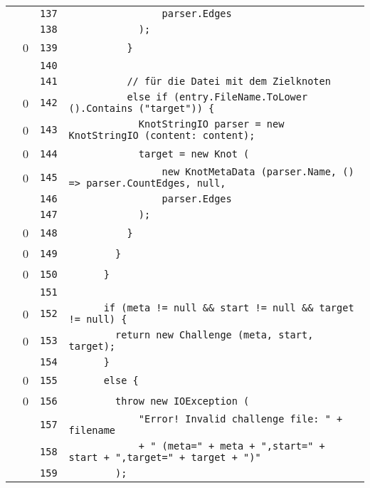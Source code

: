\documentclass[a4paper,10pt]{article}
\begin{document}
\begin{longtable}[l]{lrrl}
\cellcolor{gray} &  & \verb~137~ & \verb~                parser.Edges~\\
\cellcolor{gray} &  & \verb~138~ & \verb~            );~\\
\cellcolor{red} & 0 & \verb~139~ & \verb~          }~\\
\cellcolor{gray} &  & \verb~140~ & \verb~~\\
\cellcolor{gray} &  & \verb~141~ & \verb~          // für die Datei mit dem Zielknoten~\\
\cellcolor{red} & 0 & \verb~142~ & \verb~          else if (entry.FileName.ToLower ().Contains ("target")) {~\\
\cellcolor{red} & 0 & \verb~143~ & \verb~            KnotStringIO parser = new KnotStringIO (content: content);~\\
\cellcolor{red} & 0 & \verb~144~ & \verb~            target = new Knot (~\\
\cellcolor{red} & 0 & \verb~145~ & \verb~                new KnotMetaData (parser.Name, () => parser.CountEdges, null, ~\\
\cellcolor{gray} &  & \verb~146~ & \verb~                parser.Edges~\\
\cellcolor{gray} &  & \verb~147~ & \verb~            );~\\
\cellcolor{red} & 0 & \verb~148~ & \verb~          }~\\
\cellcolor{red} & 0 & \verb~149~ & \verb~        }~\\
\cellcolor{red} & 0 & \verb~150~ & \verb~      }~\\
\cellcolor{gray} &  & \verb~151~ & \verb~~\\
\cellcolor{red} & 0 & \verb~152~ & \verb~      if (meta != null && start != null && target != null) {~\\
\cellcolor{red} & 0 & \verb~153~ & \verb~        return new Challenge (meta, start, target);~\\
\cellcolor{gray} &  & \verb~154~ & \verb~      }~\\
\cellcolor{red} & 0 & \verb~155~ & \verb~      else {~\\
\cellcolor{red} & 0 & \verb~156~ & \verb~        throw new IOException (~\\
\cellcolor{gray} &  & \verb~157~ & \verb~            "Error! Invalid challenge file: " + filename~\\
\cellcolor{gray} &  & \verb~158~ & \verb~            + " (meta=" + meta + ",start=" + start + ",target=" + target + ")"~\\
\cellcolor{gray} &  & \verb~159~ & \verb~        );~\\

\end{longtable}
\end{document}
